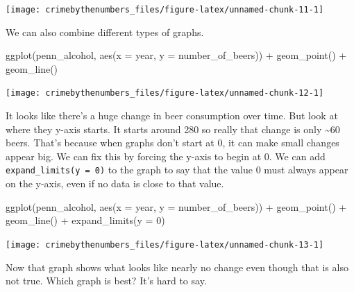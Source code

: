 \documentclass[
]{krantz}
\makeatletter
\newenvironment{Shaded}{\begin{snugshade}}{\end{snugshade}}
\newcommand{\AttributeTok}[1]{\textcolor[rgb]{0.61,0.61,0.61}{#1}}
\newcommand{\DecValTok}[1]{\textcolor[rgb]{0.06,0.06,0.06}{#1}}
\newcommand{\FunctionTok}[1]{\textcolor[rgb]{0,0,0}{#1}}
\newcommand{\NormalTok}[1]{#1}
\newcommand{\SpecialCharTok}[1]{\textcolor[rgb]{0,0,0}{#1}}
\newenvironment{kframe}{%
\medskip{}
\setlength{\fboxsep}{.8em}
 \def\at@end@of@kframe{}%
 \ifinner\ifhmode%
  \def\at@end@of@kframe{\end{minipage}}%
  \begin{minipage}{\columnwidth}%
 \fi\fi%
 \def\FrameCommand##1{\hskip\@totalleftmargin \hskip-\fboxsep
 \colorbox{shadecolor}{##1}\hskip-\fboxsep
     \hskip-\linewidth \hskip-\@totalleftmargin \hskip\columnwidth}%
 \MakeFramed {\advance\hsize-\width
   \@totalleftmargin\z@ \linewidth\hsize
   \@setminipage}}%
 {\par\unskip\endMakeFramed%
 \at@end@of@kframe}
\renewenvironment{Shaded}{\begin{kframe}}{\end{kframe}}
\makeatother
\begin{document}
\begin{center}\texttt{[image: crimebythenumbers\_files/figure-latex/unnamed-chunk-11-1]} \end{center}

We can also combine different types of graphs.

\begin{Shaded}
\begin{Highlighting}[]
\FunctionTok{ggplot}\NormalTok{(penn\_alcohol, }\FunctionTok{aes}\NormalTok{(}\AttributeTok{x =}\NormalTok{ year, }\AttributeTok{y =}\NormalTok{ number\_of\_beers)) }\SpecialCharTok{+}
  \FunctionTok{geom\_point}\NormalTok{() }\SpecialCharTok{+}
  \FunctionTok{geom\_line}\NormalTok{()}
\end{Highlighting}
\end{Shaded}

\begin{center}\texttt{[image: crimebythenumbers\_files/figure-latex/unnamed-chunk-12-1]} \end{center}

It looks like there's a huge change in beer consumption over time. But look at where they y-axis starts. It starts around 280 so really that change is only \textasciitilde60 beers. That's because when graphs don't start at 0, it can make small changes appear big. We can fix this by forcing the y-axis to begin at 0. We can add \texttt{expand\_limits(y\ =\ 0)} to the graph to say that the value 0 must always appear on the y-axis, even if no data is close to that value.

\begin{Shaded}
\begin{Highlighting}[]
\FunctionTok{ggplot}\NormalTok{(penn\_alcohol, }\FunctionTok{aes}\NormalTok{(}\AttributeTok{x =}\NormalTok{ year, }\AttributeTok{y =}\NormalTok{ number\_of\_beers)) }\SpecialCharTok{+}
  \FunctionTok{geom\_point}\NormalTok{() }\SpecialCharTok{+}
  \FunctionTok{geom\_line}\NormalTok{() }\SpecialCharTok{+}
  \FunctionTok{expand\_limits}\NormalTok{(}\AttributeTok{y =} \DecValTok{0}\NormalTok{)}
\end{Highlighting}
\end{Shaded}

\begin{center}\texttt{[image: crimebythenumbers\_files/figure-latex/unnamed-chunk-13-1]} \end{center}

Now that graph shows what looks like nearly no change even though that is also not true. Which graph is best? It's hard to say.
\end{document}
